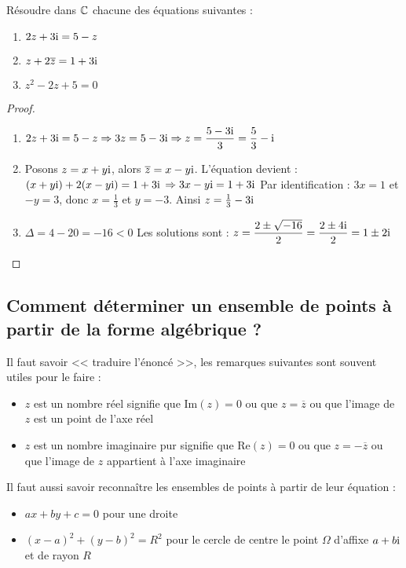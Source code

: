 \begin{example}
Résoudre dans $\mathbb{C}$ chacune des équations suivantes :
\begin{enumerate}
\item $2z + 3\text{i} = 5 - z$
\item $z + 2\overline{z} = 1 + 3\text{i}$
\item $z^2 - 2z + 5 = 0$
\end{enumerate}

\begin{proof}
\begin{enumerate}
\item $2z + 3\text{i} = 5 - z \Rightarrow 3z = 5 - 3\text{i} \Rightarrow z = \dfrac{5-3\text{i}}{3} = \dfrac{5}{3} - \text{i}$
\item Posons $z = x + y\text{i}$, alors $\overline{z} = x - y\text{i}$.
L'équation devient : $(x + y\text{i}) + 2(x - y\text{i}) = 1 + 3\text{i}$
$\Rightarrow 3x - y\text{i} = 1 + 3\text{i}$
Par identification : $3x = 1$ et $-y = 3$, donc $x = \frac{1}{3}$ et $y = -3$.
Ainsi $z = \frac{1}{3} - 3\text{i}$
\item $\Delta = 4 - 20 = -16 < 0$
Les solutions sont : $z = \dfrac{2 \pm \sqrt{-16}}{2} = \dfrac{2 \pm 4\text{i}}{2} = 1 \pm 2\text{i}$
\end{enumerate}
\end{proof}
\end{example}

\subsection{Comment déterminer un ensemble de points à partir de la forme algébrique ?}

\begin{methode}
Il faut savoir << traduire l'énoncé >>, les remarques suivantes sont souvent utiles pour le faire :
\begin{itemize}
\item $z$ est un nombre réel signifie que $\text{Im}(z) = 0$ ou que $z = \overline{z}$ ou que l'image de $z$ est un point de l'axe réel
\item $z$ est un nombre imaginaire pur signifie que $\text{Re}(z) = 0$ ou que $z = -\overline{z}$ ou que l'image de $z$ appartient à l'axe imaginaire
\end{itemize}

Il faut aussi savoir reconnaître les ensembles de points à partir de leur équation :
\begin{itemize}
\item $ax + by + c = 0$ pour une droite
\item $(x-a)^2 + (y-b)^2 = R^2$ pour le cercle de centre le point $\Omega$ d'affixe $a+b\text{i}$ et de rayon $R$
\end{itemize}
\end{methode}

